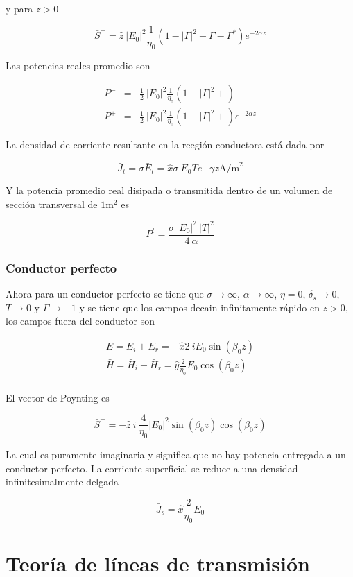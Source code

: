 y para $z>0$

\begin{equation*}
\bar{S}^{+} = \hat{z} \ |E_0|^2 \frac{1}{\eta_0} \left( 1 - |\Gamma|^2 + \Gamma - \Gamma^{*} \right) e^{-2 \alpha z}
\end{equation*}

Las potencias reales promedio son

\begin{eqnarray*}
P^- &=& \frac{1}{2} \ |E_0|^2 \frac{1}{\eta_0} \left( 1 - |\Gamma|^2 +  \right) \\
P^+ &=& \frac{1}{2} \ |E_0|^2 \frac{1}{\eta_0} \left( 1 - |\Gamma|^2 +  \right) e^{-2 \alpha z}
\end{eqnarray*}

La densidad de corriente resultante en la reegión conductora está dada por 

\begin{equation*}
\bar{J}_t = \sigma \bar{E}_t = \hat{x} \sigma \ E_0 T e{- \gamma z} \text{A/m}^2
\end{equation*}

Y la potencia promedio real disipada o transmitida dentro de un volumen de sección transversal de $1\text{m}^2$ es

\begin{equation*}
P^t = \frac{\sigma \ |E_0|^2 \ |T|^2}{4 \ \alpha}
\end{equation*}

\subsubsection*{Conductor perfecto}

Ahora para un conductor perfecto se tiene que $\sigma \to \infty$, $\alpha \to \infty$, $\eta = 0$, $\delta_s \to 0$, $T \to 0$ y $\Gamma \to -1$  y se tiene que los campos decain infinitamente rápido en $z>0$, los campos fuera del conductor son

\begin{eqnarray*}
\bar{E} = \bar{E}_i + \bar{E}_r = - \hat{x} 2 \ i E_0 \sin (\beta_0 z) \\
\bar{H} = \bar{H}_i + \bar{H}_r = \hat{y} \frac{2}{\eta_0} E_0 \cos (\beta_0 z) \\
\end{eqnarray*}

El vector de Poynting es

\begin{equation*}
\bar{S}^- = -\hat{z} \ i \ \frac{4}{\eta_0} |E_0|^2 \sin (\beta_0 z) \cos (\beta_0 z)
\end{equation*}

La cual es puramente imaginaria y significa que no hay potencia entregada a un conductor perfecto. La corriente superficial se reduce a una densidad infinitesimalmente delgada 

\begin{equation*}
\bar{J}_s = \hat{x} \frac{2}{\eta_0} E_0
\end{equation*}


\section{Teoría de líneas de transmisión}


